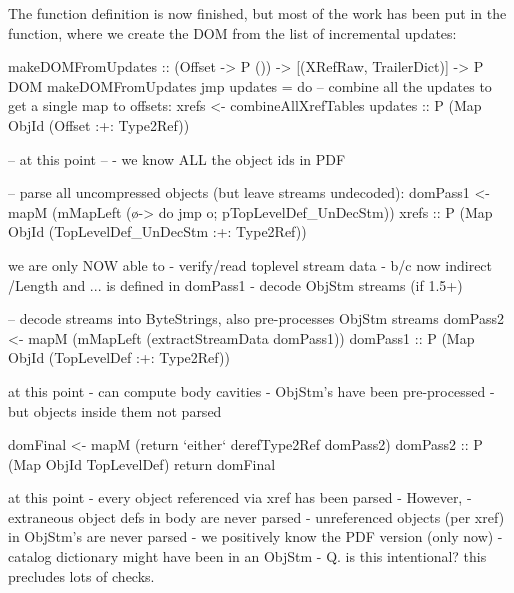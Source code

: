 The  function definition is now finished, but most of
the work has been put in the  function,
where we create the DOM from the list of incremental updates:

\begin{code}
makeDOMFromUpdates :: (Offset -> P ()) -> [(XRefRaw, TrailerDict)] -> P DOM
makeDOMFromUpdates jmp updates =
    do
    -- combine all the updates to get a single map to offsets:
    xrefs <- combineAllXrefTables updates
             :: P (Map ObjId (Offset :+: Type2Ref))

    -- at this point
    --  - we know ALL the object ids in PDF

    -- parse all uncompressed objects (but leave streams undecoded):
    domPass1 <- mapM
                  (mMapLeft (\o-> do {jmp o; pTopLevelDef_UnDecStm}))
                  xrefs
                :: P (Map ObjId (TopLevelDef_UnDecStm :+: Type2Ref))
\end{code}


we are only NOW able to
  - verify/read toplevel stream data
    - b/c now indirect /Length and ... is defined in domPass1
    - decode ObjStm streams (if 1.5+)
    
\begin{code}
    -- decode streams into ByteStrings, also pre-processes ObjStm streams
    domPass2 <- mapM
                  (mMapLeft (extractStreamData domPass1))
                  domPass1
                :: P (Map ObjId (TopLevelDef :+: Type2Ref))
\end{code}

at this point
 - can compute body cavities
 - ObjStm's have been pre-processed
   - but objects inside them not parsed

\begin{code}
    domFinal <- mapM
                 (return `either` derefType2Ref domPass2)
                  domPass2
                :: P (Map ObjId TopLevelDef)
    return domFinal
\end{code}

at this point
 - every object referenced via xref has been parsed
 - However,
   - extraneous object defs in body are never parsed
   - unreferenced objects (per xref) in ObjStm's are never parsed
 - we positively know the PDF version (only now)
   - catalog dictionary might have been in an ObjStm
   - Q. is this intentional? this precludes lots of checks.

